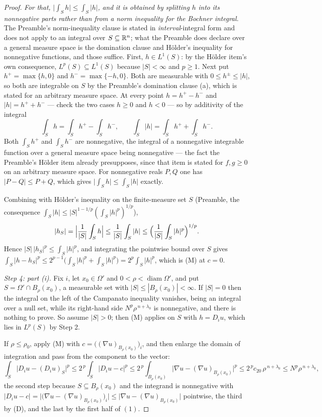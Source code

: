 \begin{proof}
\emph{For that, $\bigl|\int_Sh\bigr|\le\int_S|h|$, and it is obtained by
splitting $h$ into its nonnegative parts rather than from a norm inequality for
the Bochner integral.}  The Preamble's norm-inequality clause is stated in
\emph{interval}-integral form and does not apply to an integral over
$S\subseteq\mathbb{R}^n$; what the Preamble does declare over a general measure space is
the domination clause and H\"older's inequality for nonnegative functions, and
those suffice.  First, $h\in L^1(S)$: by the H\"older item's own consequence,
$L^{p}(S)\subseteq L^1(S)$ because $|S|<\infty$ and $p\ge1$.  Next put
$h^+=\max\{h,0\}$ and $h^-=\max\{-h,0\}$.  Both are measurable with
$0\le h^{\pm}\le|h|$, so both are integrable on $S$ by the Preamble's
domination clause (a), which is stated for an arbitrary measure space.  At every
point $h=h^+-h^-$ and $|h|=h^++h^-$ --- check the two cases $h\ge0$ and $h<0$
--- so by additivity of the integral
\[
\int_Sh=\int_Sh^+-\int_Sh^- ,
\qquad
\int_S|h|=\int_Sh^++\int_Sh^- .
\]
Both $\int_Sh^+$ and $\int_Sh^-$ are nonnegative, the integral of a nonnegative
integrable function over a general measure space being nonnegative --- the fact
the Preamble's H\"older item already presupposes, since that item is stated for
$f,g\ge0$ on an arbitrary measure space.  For nonnegative reals $P,Q$ one has
$|P-Q|\le P+Q$, which gives $\bigl|\int_Sh\bigr|\le\int_S|h|$ exactly.

Combining with H\"older's inequality on the finite-measure set $S$ (Preamble,
the consequence $\int_S|h|\le|S|^{1-1/p}(\int_S|h|^p)^{1/p}$),
\[
|h_S|=\Bigl|\frac1{|S|}\int_Sh\Bigr|\le\frac1{|S|}\int_S|h|
\le\Bigl(\frac1{|S|}\int_S|h|^p\Bigr)^{1/p} .
\]
Hence $|S|\,|h_S|^p\le\int_S|h|^p$, and integrating the pointwise bound over $S$
gives
$\int_S|h-h_S|^p\le2^{p-1}\bigl(\int_S|h|^p+\int_S|h|^p\bigr)=2^p\int_S|h|^p$,
which is (M) at $c=0$.

\emph{Step 4: part \textup{(i)}.}  Fix $i$, let $x_0\in\Omega'$ and
$0<\rho<\operatorname{diam}\Omega'$, and put $S=\Omega'\cap B_\rho(x_0)$, a
measurable set with $|S|\le|B_\rho(x_0)|<\infty$.  If $|S|=0$ then the integral
on the left of the Campanato inequality vanishes, being an integral over a null
set, while its right-hand side $N^p\rho^{\,n+\lambda_0}$ is nonnegative, and
there is nothing to prove.  So assume $|S|>0$; then (M) applies on $S$ with
$h=D_iu$, which lies in $L^p(S)$ by Step 2.

If $\rho\le\rho_0$, apply (M) with
$c=\bigl((\nabla u)_{B_\rho(x_0)}\bigr)_i$, and then enlarge the domain of
integration and pass from the component to the vector:
\[
\int_S\bigl|D_iu-(D_iu)_S\bigr|^p
\le2^{\,p}\!\int_S\bigl|D_iu-c\bigr|^p
\le2^{\,p}\!\int_{B_\rho(x_0)}\bigl|\nabla u-(\nabla u)_{B_\rho(x_0)}\bigr|^p
\le2^{\,p}c_{20}\,\rho^{\,n+\lambda_0}
\le N^p\rho^{\,n+\lambda_0},
\]
the second step because $S\subseteq B_\rho(x_0)$ and the integrand is
nonnegative with
$|D_iu-c|=\bigl|\bigl(\nabla u-(\nabla u)_{B_\rho(x_0)}\bigr)_i\bigr|
\le\bigl|\nabla u-(\nabla u)_{B_\rho(x_0)}\bigr|$ pointwise, the third by (D),
and the last by the first half of $(1)$.


\end{proof}
